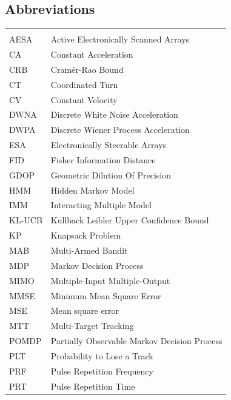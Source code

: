 \documentclass[english, 12pt, a4paper, elec, utf8, a-1b, online]{aaltothesis}
\numberwithin{equation}{section}
\begin{document}
\subsection*{Abbreviations}

\begin{tabular}{ll}
&\\
AESA & Active Electronically Scanned Arrays \\
CA & Constant Acceleration \\
CRB  & Cram\'er-Rao Bound \\
CT & Coordinated Turn \\
CV & Constant Velocity \\
DWNA & Discrete White Noise Acceleration \\
DWPA & Discrete Wiener Process Acceleration \\
ESA & Electronically Steerable Arrays \\
FID & Fisher Information Distance \\
GDOP & Geometric Dilution Of Precision \\
HMM & Hidden Markov Model \\
IMM & Interacting Multiple Model \\
KL-UCB & Kullback Leibler Upper Confidence Bound \\
KP & Knapsack Problem \\
MAB  & Multi-Armed Bandit \\
MDP & Markov Decision Process \\
MIMO & Multiple-Input Multiple-Output \\
MMSE & Minimum Mean Square Error \\
MSE & Mean square error \\
MTT & Multi-Target Tracking \\
POMDP & Partially Observable Markov Decision Process \\
PLT & Probability to Lose a Track \\
PRF  &  Pulse Repetition Frequency \\
PRT  & Pulse Repetition Time \\

\end{tabular}
\end{document}
